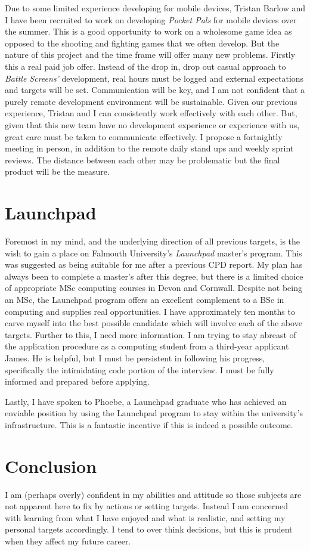 \documentclass{scrartcl}
\begin{document}
Due to some limited experience developing for mobile devices, Tristan Barlow and I have been recruited to work on developing \textit{Pocket Pals} for mobile devices over the summer. This is a good opportunity to work on a wholesome game idea as opposed to the shooting and fighting games that we often develop. But the nature of this project and the time frame will offer many new problems. Firstly this a real paid job offer. Instead of the drop in, drop out casual approach to \textit{Battle Screens'} development, real hours must be logged and external expectations and targets will be set. Communication will be key, and I am not confident that a purely remote development environment will be sustainable. Given our previous experience, Tristan and I can consistently work effectively with each other. But, given that this new team have no development experience or experience with us, great care must be taken to communicate effectively. I propose a fortnightly meeting in person, in addition to the remote daily stand ups and weekly sprint reviews. The distance between each other may be problematic but the final product will be the measure.

\section*{Launchpad}

Foremost in my mind, and the underlying direction of all previous targets, is the wish to gain a place on Falmouth University's \textit{Launchpad} master's program. This was suggested as being suitable for me after a previous CPD report. My plan has always been to complete a master's after this degree, but there is a limited choice of appropriate MSc computing courses in Devon and Cornwall. Despite not being an MSc, the Launchpad program offers an excellent complement to a BSc in computing and supplies real opportunities. I have approximately ten months to carve myself into the best possible candidate which will involve each of the above targets. Further to this, I need more information. I am trying to stay abreast of the application procedure as a computing student from a third-year applicant James. He is helpful, but I must be persistent in following his progress, specifically the intimidating code portion of the interview. I must be fully informed and prepared before applying.

Lastly, I have spoken to Phoebe, a Launchpad graduate who has achieved an enviable position by using the Launchpad program to stay within the university's infrastructure. This is a fantastic incentive if this is indeed a possible outcome.

\section*{Conclusion}

I am (perhaps overly) confident in my abilities and attitude so those subjects are not apparent here to fix by actions or setting targets. Instead I am concerned with learning from what I have enjoyed and what is realistic, and setting my personal targets accordingly. I tend to over think decisions, but this is prudent when they affect my future career.
\end{document}
